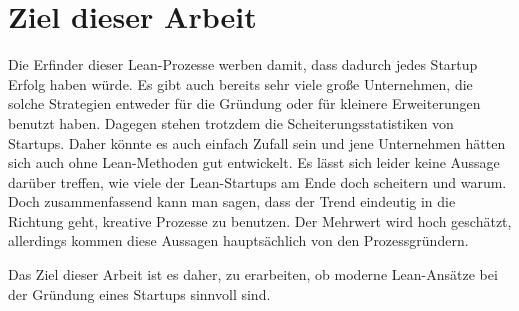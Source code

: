 \section{Ziel dieser Arbeit}
Die Erfinder dieser Lean-Prozesse werben damit, dass dadurch jedes Startup Erfolg haben würde. Es gibt auch bereits sehr viele große Unternehmen, die solche Strategien entweder für die Gründung oder für kleinere Erweiterungen benutzt haben. Dagegen stehen trotzdem die Scheiterungsstatistiken von Startups. Daher könnte es auch einfach Zufall sein und jene Unternehmen hätten sich auch ohne Lean-Methoden gut entwickelt. Es lässt sich leider keine Aussage darüber treffen, wie viele der Lean-Startups am Ende doch scheitern und warum. Doch zusammenfassend kann man sagen, dass der Trend eindeutig in die Richtung geht, kreative Prozesse zu benutzen. Der Mehrwert wird hoch geschätzt, allerdings kommen diese Aussagen hauptsächlich von den Prozessgründern.

Das Ziel dieser Arbeit ist es daher, zu erarbeiten, ob moderne Lean-Ansätze bei der Gründung eines Startups sinnvoll sind. 